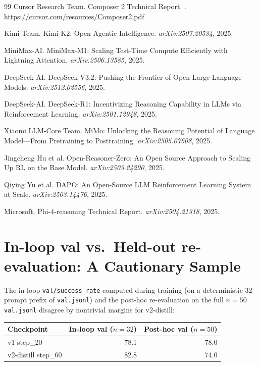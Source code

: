 \documentclass[10pt]{article}
\begin{document}
\begin{thebibliography}{99}
Cursor Research Team.
\newblock Composer 2 Technical Report.
.
\newblock \url{https://cursor.com/resources/Composer2.pdf}

Kimi Team.
\newblock Kimi K2: Open Agentic Intelligence.
\newblock \emph{arXiv:2507.20534}, 2025.

MiniMax-AI.
\newblock MiniMax-M1: Scaling Test-Time Compute Efficiently with Lightning
  Attention.
\newblock \emph{arXiv:2506.13585}, 2025.

DeepSeek-AI.
\newblock DeepSeek-V3.2: Pushing the Frontier of Open Large Language Models.
\newblock \emph{arXiv:2512.02556}, 2025.

DeepSeek-AI.
\newblock DeepSeek-R1: Incentivizing Reasoning Capability in LLMs via
  Reinforcement Learning.
\newblock \emph{arXiv:2501.12948}, 2025.

Xiaomi LLM-Core Team.
\newblock MiMo: Unlocking the Reasoning Potential of Language
  Model---From Pretraining to Posttraining.
\newblock \emph{arXiv:2505.07608}, 2025.

Jingcheng Hu et al.
\newblock Open-Reasoner-Zero: An Open Source Approach to Scaling Up RL on
  the Base Model.
\newblock \emph{arXiv:2503.24290}, 2025.

Qiying Yu et al.
\newblock DAPO: An Open-Source LLM Reinforcement Learning System at Scale.
\newblock \emph{arXiv:2503.14476}, 2025.

Microsoft.
\newblock Phi-4-reasoning Technical Report.
\newblock \emph{arXiv:2504.21318}, 2025.

\end{thebibliography}

\appendix
\section{In-loop val vs.\ Held-out re-evaluation: A Cautionary Sample}
\label{app:val_disagreement}

The in-loop \texttt{val/success\_rate} computed during training (on a
deterministic 32-prompt prefix of \texttt{val.jsonl}) and the post-hoc
re-evaluation on the full $n=50$ \texttt{val.jsonl} disagree by
nontrivial margins for v2-distill:

\begin{center}
\small
\begin{tabular}{lrr}
\toprule
\textbf{Checkpoint} & \textbf{In-loop val} ($n{=}32$) & \textbf{Post-hoc val} ($n{=}50$) \\
\midrule
v1 step\_20         & 78.1 & 78.0 \\
v2-distill step\_60 & 82.8 & 74.0 \\
\bottomrule
\end{tabular}
\end{center}
\end{document}
